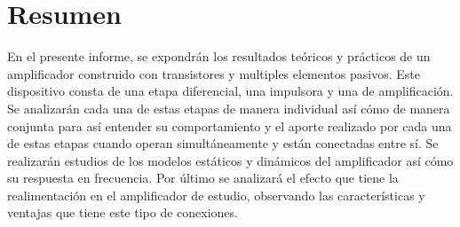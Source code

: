 \section{Resumen}

En el presente informe, se expondrán los resultados teóricos y prácticos de un amplificador construido con transistores y multiples elementos pasivos. Este dispositivo consta de una etapa diferencial, una impulsora y una de amplificación. Se analizarán cada una de estas etapas de manera individual así cómo de manera  conjunta para así entender su comportamiento y el aporte realizado por cada una de estas etapas cuando operan simultáneamente y están conectadas entre sí. Se realizarán estudios de los modelos estáticos y dinámicos del amplificador así cómo su respuesta en frecuencia. Por último se analizará el efecto que tiene la realimentación en el amplificador de estudio, observando las características y ventajas que tiene este tipo de conexiones. 